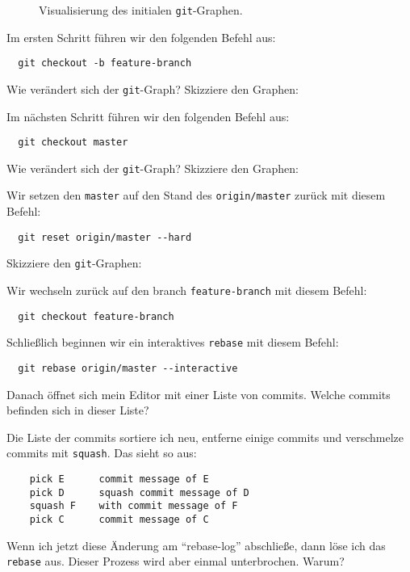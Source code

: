 \documentclass[addpoints]{exam}
\begin{document}
\begin{questions}
\begin{parts}
\begin{figure}[h]
  \centering
  
  \caption{Visualisierung des initialen \texttt{git}-Graphen.}
  \label{fig:git:initial}
\end{figure}

\begin{subparts}
  \subpart[1]
  Im ersten Schritt führen wir den folgenden Befehl aus:
  \begin{lstlisting}
  git checkout -b feature-branch
  \end{lstlisting}
  Wie verändert sich der \texttt{git}-Graph? Skizziere den Graphen:
  \makeemptybox{12em}

  \subpart[1]
  Im nächsten Schritt führen wir den folgenden Befehl aus:
  \begin{lstlisting}
  git checkout master
  \end{lstlisting}
  Wie verändert sich der \texttt{git}-Graph? Skizziere den Graphen:
  \makeemptybox{12em}

  \subpart[1]
  Wir setzen den \texttt{master} auf den Stand des \texttt{origin/master} zurück
  mit diesem Befehl:
  \begin{lstlisting}
  git reset origin/master --hard
  \end{lstlisting}
  Skizziere den \texttt{git}-Graphen:
  \makeemptybox{12em}

  \subpart[1]
  Wir wechseln zurück auf den branch \texttt{feature-branch} mit diesem Befehl:
  \begin{lstlisting}
  git checkout feature-branch
  \end{lstlisting}
  Schließlich beginnen wir ein interaktives \texttt{rebase} mit diesem Befehl:
  \begin{lstlisting}
  git rebase origin/master --interactive
  \end{lstlisting}
  Danach öffnet sich mein Editor mit einer Liste von commits. Welche commits
  befinden sich in dieser Liste?
  \fillwithdottedlines{3em}

  \subpart[1]
  Die Liste der commits sortiere ich neu, entferne einige commits und
  verschmelze commits mit \texttt{squash}. Das sieht so aus:
  \begin{lstlisting}
    pick E      commit message of E
    pick D      squash commit message of D
    squash F    with commit message of F
    pick C      commit message of C
  \end{lstlisting}
  Wenn ich jetzt diese Änderung am ``rebase-log'' abschließe, dann löse ich das
  \texttt{rebase} aus. Dieser Prozess wird aber einmal unterbrochen. Warum?
  \fillwithdottedlines{3em}


\end{subparts}
\end{parts}
\end{questions}
\end{document}
